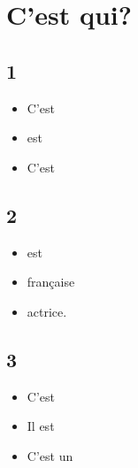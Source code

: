\section{C'est qui?}
\subsection{1}
\begin{itemize}
    \item C'est
    \item est
    \item C'est
\end{itemize}

\subsection{2}
\begin{itemize}
    \item est
    \item française
    \item actrice.
\end{itemize}

\subsection{3}
\begin{itemize}
    \item C'est
    \item Il est
    \item C'est un
\end{itemize}